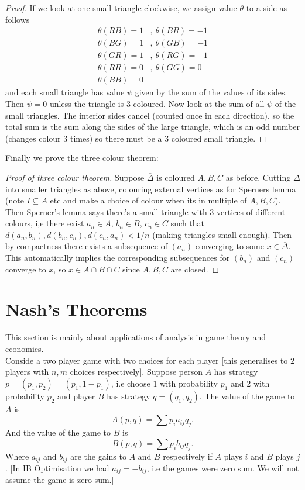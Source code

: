 \documentclass[a4paper, 10pt, twocolumn]{amsart}
\theoremstyle{definition}
\newcommand{\sbs}[0]{\subseteq}
\newcommand{\1}{\mathbbm{1}}
\begin{document}
\begin{proof}
    If we look at one small triangle clockwise, we assign value $\theta$ to a side as follows \begin{align*}
        \theta(RB) = 1&,\ \theta(BR) = -1\\
        \theta(BG) = 1&,\ \theta(GB) = -1\\
        \theta(GR) = 1&,\ \theta(RG) = -1\\
        \theta(RR) = 0&,\ \theta(GG) = 0\\
        \theta(BB) = 0 & 
    \end{align*}
    and each small triangle has value $\psi$ given by the sum of the values of its sides. Then $\psi = 0$ unless the triangle is 3 coloured. Now look at the sum of all $\psi$ of the small triangles. The interior sides cancel (counted once in each direction), so the total sum is the sum along the sides of the large triangle, which is an odd number (changes colour $3$ times) so there must be a $3$ coloured small triangle.
\end{proof}

Finally we prove the three colour theorem:

\begin{proof}[Proof of three colour theorem]
    Suppose $\overline{\Delta}$ is coloured $A,B,C$ as before. Cutting $\Delta$ into smaller triangles as above, colouring external vertices as for Sperners lemma (note $I \sbs A$ etc and make a choice of colour when its in multiple of $A,B,C$). Then Sperner's lemma says there's a small triangle with $3$ vertices of different colours, i,e there exist $a_n \in A$, $b_n \in B$, $c_n \in C$ such that $d(a_n,b_n),d(b_n,c_n),d(c_n,a_n) < 1/n$ (making triangles small enough). Then by compactness there exists a subsequence of $(a_n)$ converging to some $x \in \overline{\Delta}$. This automatically implies the corresponding subsequences for $(b_n)$ and $(c_n)$ converge to $x$, so $x \in A \cap B \cap C$ since $A,B,C$ are closed. 
\end{proof}

\section{Nash's Theorems}

This section is mainly about applications of analysis in game theory and economics.\\

Conside a two player game with two choices for each player [this generalises to $2$ players with $n,m$ choices respectively]. Suppose person $A$ has strategy $p=(p_1,p_2)=(p_1,1-p_1)$, i.e choose $1$ with probability $p_1$ and $2$ with probability $p_2$ and player $B$ has strategy $q = (q_1,q_2)$. The value of the game to $A$ is \[A(p,q) = \sum p_ia_{ij}q_j.\]
And the value of the game to $B$ is \[B(p,q) = \sum p_ib_{ij}q_j.\]
Where $a_{ij}$ and $b_{ij}$ are the gains to $A$ and $B$ respectively if $A$ plays $i$ and $B$ plays $j$. [In IB Optimisation we had $a_{ij} = -b_{ij}$, i.e the games were zero sum. We will not assume the game is zero sum.]\\
\end{document}
